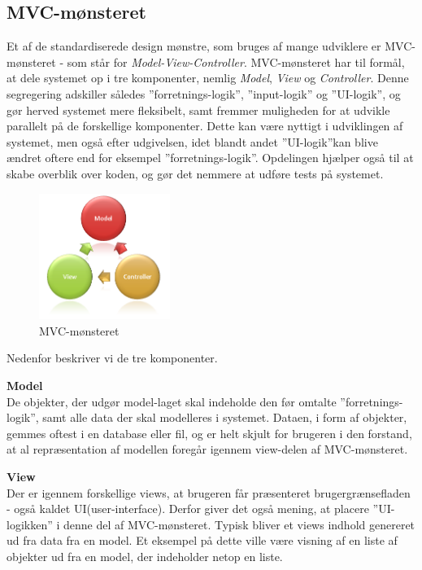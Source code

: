 \subsection{MVC-mønsteret}\label{MVC}
Et af de standardiserede design mønstre, som bruges af mange udviklere er MVC-mønsteret - som står for \textit{Model-View-Controller}.
MVC-mønsteret har til formål, at dele systemet op i tre komponenter, nemlig \textit{Model}, \textit{View} og \textit{Controller}.
Denne segregering adskiller således ''forretnings-logik'', ''input-logik'' og ''UI-logik'', og gør herved systemet mere fleksibelt, samt fremmer muligheden for at udvikle parallelt på de forskellige komponenter.
Dette kan være nyttigt i udviklingen af systemet, men også efter udgivelsen, idet blandt andet ''UI-logik''kan blive ændret oftere end for eksempel ''forretnings-logik''.
Opdelingen hjælper også til at skabe overblik over koden, og gør det nemmere at udføre tests på systemet. \citep{MVC_Overview}

\begin{figure}
	\vspace{-20pt}
	\begin{center}
		\includegraphics[width=0.38\textwidth]{images/Images/mvc.png}
	\end{center}
	\vspace{-20pt}
	\caption{MVC-mønsteret}
	\vspace{-20pt}
\end{figure}


Nedenfor beskriver vi de tre komponenter.

\textbf{Model}\\
De objekter, der udgør model-laget skal indeholde den før omtalte ''forretnings-logik'', samt alle data der skal modelleres i systemet.
Dataen, i form af objekter, gemmes oftest i en database eller fil, og er helt skjult for brugeren i den forstand, at al repræsentation af modellen foregår igennem view-delen af MVC-mønsteret.

\textbf{View}\\
Der er igennem forskellige views, at brugeren får præsenteret brugergrænsefladen - også kaldet UI(user-interface).
Derfor giver det også mening, at placere ''UI-logikken'' i denne del af MVC-mønsteret.
Typisk bliver et views indhold genereret ud fra data fra en model.
Et eksempel på dette ville være visning af en liste af objekter ud fra en model, der indeholder netop en liste.

